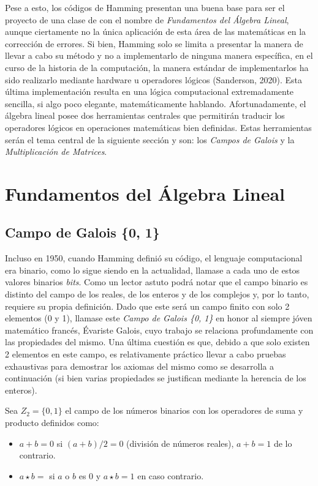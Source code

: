\documentclass{article}
\begin{document}
Pese a esto, los códigos de Hamming presentan una buena base para ser el proyecto de una clase de con el nombre de \textit{Fundamentos del Álgebra Lineal}, aunque ciertamente no la única aplicación de esta área de las matemáticas en la corrección de errores. Si bien, Hamming solo se limita a presentar la manera de llevar a cabo su método y no a implementarlo de ninguna manera específica, en el curso de la historia de la computación, la manera estándar de implementarlos ha sido realizarlo mediante hardware u operadores lógicos (Sanderson, 2020). Esta última implementación resulta en una lógica computacional extremadamente sencilla, si algo poco elegante, matemáticamente hablando. Afortunadamente, el álgebra lineal posee dos herramientas centrales que permitirán traducir los operadores lógicos en operaciones matemáticas bien definidas. Estas herramientas serán el tema central de la siguiente sección y son: los \textit{Campos de Galois} y la \textit{Multiplicación de Matrices}.

\section{Fundamentos del Álgebra Lineal}

\subsection{Campo de Galois \{0, 1\}}

Incluso en 1950, cuando Hamming definió su código, el lenguaje computacional era binario, como lo sigue siendo en la actualidad, llamase a cada uno de estos valores binarios \textit{bits}. Como un lector astuto podrá notar que el campo binario es distinto del campo de los reales, de los enteros y de los complejos y, por lo tanto, requiere su propia definición. Dado que este será un campo finito con solo 2 elementos (0 y 1), llamase este \textit{Campo de Galois \{0, 1\}} en honor al siempre jóven matemático francés, Évariste Galois, cuyo trabajo se relaciona profundamente con las propiedades del mismo. Una última cuestión es que, debido a que solo existen 2 elementos en este campo, es relativamente práctico llevar a cabo pruebas exhaustivas para demostrar los axiomas del mismo como se desarrolla a continuación (si bien varias propiedades se justifican mediante la herencia de los enteros).

Sea $Z_2 = \{0, 1\}$ el campo de los números binarios con los operadores de suma y producto definidos como:
\begin{itemize}
    \item $a + b = 0$ si $(a + b)/2 = 0$ (división de números reales), $a + b = 1$ de lo contrario.
    \item $a \star b = $ si $a$ o $b$ es $0$ y $a \star b = 1$ en caso contrario.
\end{itemize}
\end{document}
